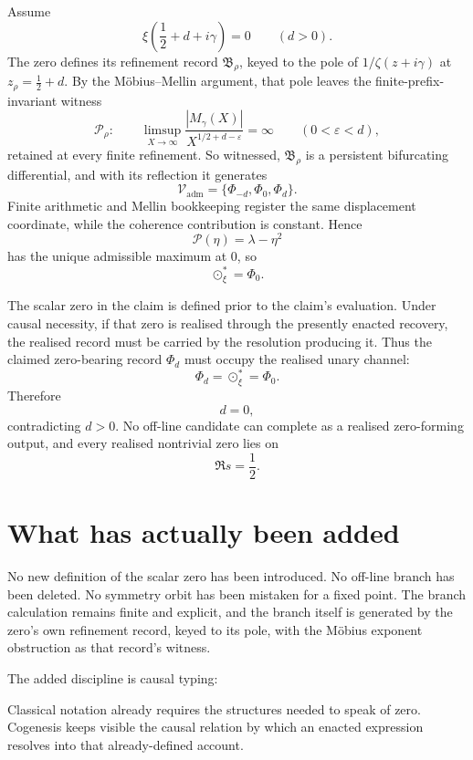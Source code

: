 \documentclass[11pt]{article}
\newcommand{\Pheart}{\mathcal P}
\begin{document}
Assume
\[
\xi\!\left(\frac12+d+i\gamma\right)=0
\qquad(d>0).
\]
The zero defines its refinement record \(\mathfrak B_\rho\), keyed to the pole of \(1/\zeta(z+i\gamma)\) at \(z_\rho=\frac12+d\). By the M\"obius--Mellin argument, that pole leaves the finite-prefix-invariant witness
\[
\mathcal P_\rho:
\qquad
\limsup_{X\to\infty}
\frac{|M_\gamma(X)|}{X^{1/2+d-\varepsilon}}
=
\infty
\qquad(0<\varepsilon<d),
\]
retained at every finite refinement. So witnessed, \(\mathfrak B_\rho\) is a persistent bifurcating differential, and with its reflection it generates
\[
\mathcal V_{\mathrm{adm}}
=
\{\Phi_{-d},\Phi_0,\Phi_d\}.
\]
Finite arithmetic and Mellin bookkeeping register the same displacement coordinate, while the coherence contribution is constant. Hence
\[
\Pheart(\eta)=\lambda-\eta^2
\]
has the unique admissible maximum at \(0\), so
\[
\odot_\xi^\ast=\Phi_0.
\]

The scalar zero in the claim is defined prior to the claim's evaluation. Under causal necessity, if that zero is realised through the presently enacted recovery, the realised record must be carried by the resolution producing it. Thus the claimed zero-bearing record \(\Phi_d\) must occupy the realised unary channel:
\[
\Phi_d=\odot_\xi^\ast=\Phi_0.
\]
Therefore
\[
d=0,
\]
contradicting \(d>0\). No off-line candidate can complete as a realised zero-forming output, and every realised nontrivial zero lies on
\[
\Re s=\frac12.
\]

\section{What has actually been added}

No new definition of the scalar zero has been introduced. No off-line branch has been deleted. No symmetry orbit has been mistaken for a fixed point. The branch calculation remains finite and explicit, and the branch itself is generated by the zero's own refinement record, keyed to its pole, with the M\"obius exponent obstruction as that record's witness.

The added discipline is causal typing:

\medskip
\noindent
{}
\medskip

Classical notation already requires the structures needed to speak of zero. Cogenesis keeps visible the causal relation by which an enacted expression resolves into that already-defined account.
\end{document}
